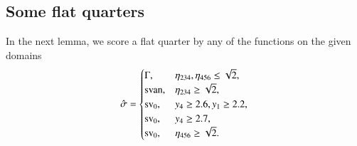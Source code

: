 %
%
%
%
%
%
%
%
%
%
%
%


\subsection{Some flat quarters} %
    \label{sec:some-flat}




In the next lemma, we score a flat quarter by any of the functions
on the given domains
     $$\hat\sigma=
        \begin{cases}
            \Gamma,& \eta_{234},\eta_{456}\le\sqrt2,\\
             {\operatorname{svan}}, &\eta_{234}\ge\sqrt2,\\
            {\operatorname{sv}}_0, & y_4\ge 2.6, y_1\ge2.2,\\
            {\operatorname{sv}}_0, & y_4\ge 2.7,\\
            {\operatorname{sv}}_0,& \eta_{456}\ge\sqrt2.
        \end{cases}
    $$

